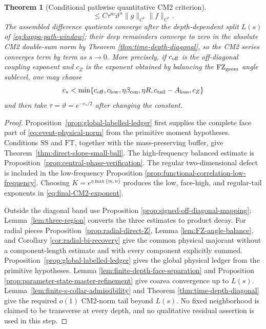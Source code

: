 \documentclass[11pt]{article}
\newtheorem{theorem}{Theorem}[section]
\begin{document}
\begin{theorem}[Conditional pathwise quantitative CM2 criterion]
\[ \le C\tau^m\vartheta^n\|g\|_{C^r}\|f\|_{C^r}.
\]
The assembled difference quotients converge after the depth-dependent split
$L(s)$ of \eqref{eq:kappa-path-window}; their deep remainders converge to zero
in the absolute CM2 double-sum norm by Theorem
\ref{thm:time-depth-diagonal}, so the CM2 series converges term by term as
$s\to0$.  More
precisely, if $c_{\rm off}$ is the off-diagonal coupling exponent and $c_Z$
is the exponent obtained by balancing the $\mathrm{FZ}_{\rm geom}$ angle sublevel, one
may choose
\begin{equation}
\label{eq:final-CM2-exponent}
 c_*<\min\{c_{\rm off},c_{\rm low},
 \eta\beta_{\rm cen},\eta R,
 c_{\rm tail}-A_{\rm loss},c_Z\}
\end{equation}
and then take $\tau=\vartheta=e^{-c_*/2}$ after changing the constant.
\end{theorem}

\begin{proof}
Proposition~\ref{prop:global-labelled-ledger} first supplies the complete face
part of \eqref{eq:event-physical-norm} from the primitive moment hypotheses.
Conditions $\mathrm{SS}$ and $\mathrm{FT}$, together with the
mass-preserving buffer, give
Theorem~\ref{thm:direct-slope-small-ball}.  The high-frequency balanced
estimate is Proposition~\ref{prop:central-phase-verification}.  The regular
two-dimensional defect is included in the low-frequency Proposition
\ref{prop:functional-correlation-low-frequency}.  Choosing
$K=e^{\eta\max\{m,n\}}$ produces the low, face-high, and regular-tail
exponents in
\eqref{eq:final-CM2-exponent}.

Outside the diagonal band use Proposition
\ref{prop:signed-off-diagonal-mapping};
Lemma~\ref{lem:three-region} converts the three estimates to product decay.
For radial pieces Proposition~\ref{prop:radial-direct-Z}, Lemma
\ref{lem:FZ-angle-balance}, and Corollary
\ref{cor:radial-bi-recovery} give the common physical majorant without a
component-length estimate and with every component explicitly summed.
Proposition~\ref{prop:global-labelled-ledger} gives the global physical
ledger from the primitive hypotheses.  Lemma
\ref{lem:finite-depth-face-separation} and Proposition
\ref{prop:parameter-state-master-refinement} give coarea convergence up to
$L(s)$.  Lemma~\ref{lem:finite-s-collar-admissibility} and Theorem
\ref{thm:time-depth-diagonal} give the required $o(1)$ CM2-norm tail beyond
$L(s)$.  No fixed neighborhood is
claimed to be transverse at every depth, and no qualitative residual
assertion is used in this step.
\end{proof}
\end{document}
